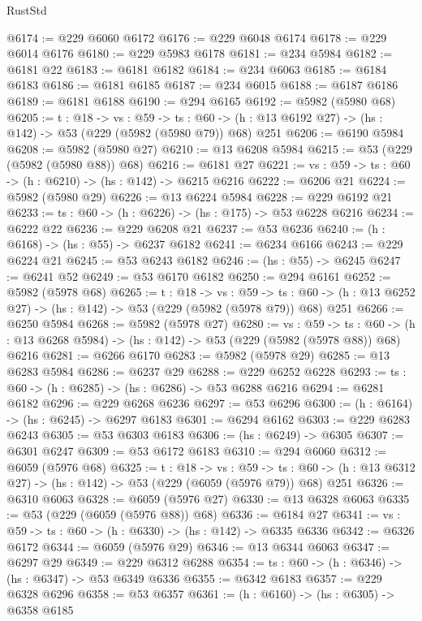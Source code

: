 \begin{lexlean}{RustStd}
\begin{coremodule}
@6174 := @229 @6060 @6172
@6176 := @229 @6048 @6174
@6178 := @229 @6014 @6176
@6180 := @229 @5983 @6178
@6181 := @234 @5984
@6182 := @6181 @22
@6183 := @6181 @6182
@6184 := @234 @6063
@6185 := @6184 @6183
@6186 := @6181 @6185
@6187 := @234 @6015
@6188 := @6187 @6186
@6189 := @6181 @6188
@6190 := @294 @6165
@6192 := @5982 (@5980 @68)
@6205 := {t : @18} ->
  {vs : @59} ->
  {ts : @60} -> (h : @13 @6192 @27) -> (hs : @142) -> @53 (@229 (@5982 (@5980 @79)) @68) @251
@6206 := @6190 @5984
@6208 := @5982 (@5980 @27)
@6210 := @13 @6208 @5984
@6215 := @53 (@229 (@5982 (@5980 @88)) @68)
@6216 := @6181 @27
@6221 := {vs : @59} -> {ts : @60} -> (h : @6210) -> (hs : @142) -> @6215 @6216
@6222 := @6206 @21
@6224 := @5982 (@5980 @29)
@6226 := @13 @6224 @5984
@6228 := @229 @6192 @21
@6233 := {ts : @60} -> (h : @6226) -> (hs : @175) -> @53 @6228 @6216
@6234 := @6222 @22
@6236 := @229 @6208 @21
@6237 := @53 @6236
@6240 := (h : @6168) -> (hs : @55) -> @6237 @6182
@6241 := @6234 @6166
@6243 := @229 @6224 @21
@6245 := @53 @6243 @6182
@6246 := (hs : @55) -> @6245
@6247 := @6241 @52
@6249 := @53 @6170 @6182
@6250 := @294 @6161
@6252 := @5982 (@5978 @68)
@6265 := {t : @18} ->
  {vs : @59} ->
  {ts : @60} -> (h : @13 @6252 @27) -> (hs : @142) -> @53 (@229 (@5982 (@5978 @79)) @68) @251
@6266 := @6250 @5984
@6268 := @5982 (@5978 @27)
@6280 := {vs : @59} ->
  {ts : @60} -> (h : @13 @6268 @5984) -> (hs : @142) -> @53 (@229 (@5982 (@5978 @88)) @68) @6216
@6281 := @6266 @6170
@6283 := @5982 (@5978 @29)
@6285 := @13 @6283 @5984
@6286 := @6237 @29
@6288 := @229 @6252 @6228
@6293 := {ts : @60} -> (h : @6285) -> (hs : @6286) -> @53 @6288 @6216
@6294 := @6281 @6182
@6296 := @229 @6268 @6236
@6297 := @53 @6296
@6300 := (h : @6164) -> (hs : @6245) -> @6297 @6183
@6301 := @6294 @6162
@6303 := @229 @6283 @6243
@6305 := @53 @6303 @6183
@6306 := (hs : @6249) -> @6305
@6307 := @6301 @6247
@6309 := @53 @6172 @6183
@6310 := @294 @6060
@6312 := @6059 (@5976 @68)
@6325 := {t : @18} ->
  {vs : @59} ->
  {ts : @60} -> (h : @13 @6312 @27) -> (hs : @142) -> @53 (@229 (@6059 (@5976 @79)) @68) @251
@6326 := @6310 @6063
@6328 := @6059 (@5976 @27)
@6330 := @13 @6328 @6063
@6335 := @53 (@229 (@6059 (@5976 @88)) @68)
@6336 := @6184 @27
@6341 := {vs : @59} -> {ts : @60} -> (h : @6330) -> (hs : @142) -> @6335 @6336
@6342 := @6326 @6172
@6344 := @6059 (@5976 @29)
@6346 := @13 @6344 @6063
@6347 := @6297 @29
@6349 := @229 @6312 @6288
@6354 := {ts : @60} -> (h : @6346) -> (hs : @6347) -> @53 @6349 @6336
@6355 := @6342 @6183
@6357 := @229 @6328 @6296
@6358 := @53 @6357
@6361 := (h : @6160) -> (hs : @6305) -> @6358 @6185

\end{coremodule}
\end{lexlean}
